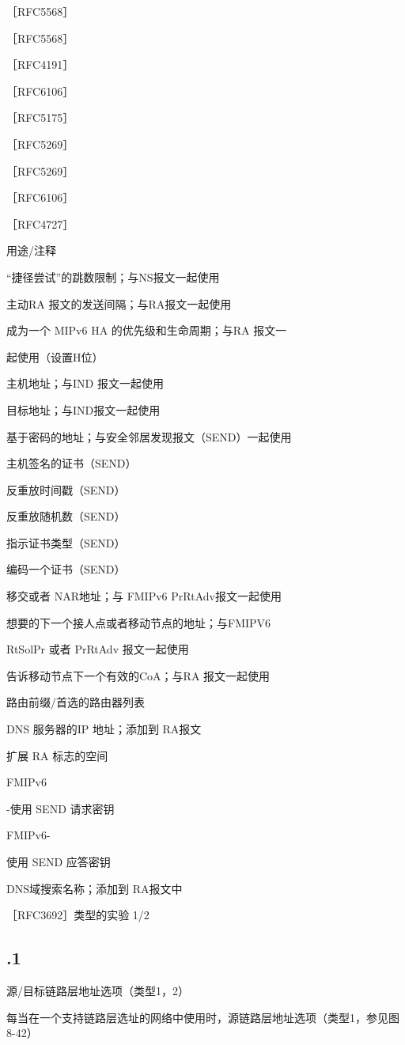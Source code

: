 ［RFC5568］

［RFC5568］

［RFC4191］

［RFC6106］

［RFC5175］

［RFC5269］

［RFC5269］

［RFC6106］

［RFC4727］

用途/注释

“捷径尝试”的跳数限制；与NS报文一起使用

主动RA 报文的发送间隔；与RA报文一起使用

成为一个 MIPv6 HA 的优先级和生命周期；与RA 报文一

起使用（设置H位）

主机地址；与IND 报文一起使用

目标地址；与IND报文一起使用

基于密码的地址；与安全邻居发现报文（SEND）一起使用

主机签名的证书（SEND）

反重放时间戳（SEND）

反重放随机数（SEND）

指示证书类型（SEND）

编码一个证书（SEND）

移交或者 NAR地址；与 FMIPv6 PrRtAdv报文一起使用

想要的下一个接人点或者移动节点的地址；与FMIPV6

RtSolPr 或者 PrRtAdv 报文一起使用

告诉移动节点下一个有效的CoA；与RA 报文一起使用

路由前缀/首选的路由器列表

DNS 服务器的IP 地址；添加到 RA报文

扩展 RA 标志的空间

FMIPv6

-使用 SEND 请求密钥

FMIPv6-

使用 SEND 应答密钥

DNS域搜索名称；添加到 RA报文中

［RFC3692］类型的实验 1/2

\subsection{.1}
源/目标链路层地址选项（类型1，2）

每当在一个支持链路层选址的网络中使用时，源链路层地址选项（类型1，参见图8-42）

